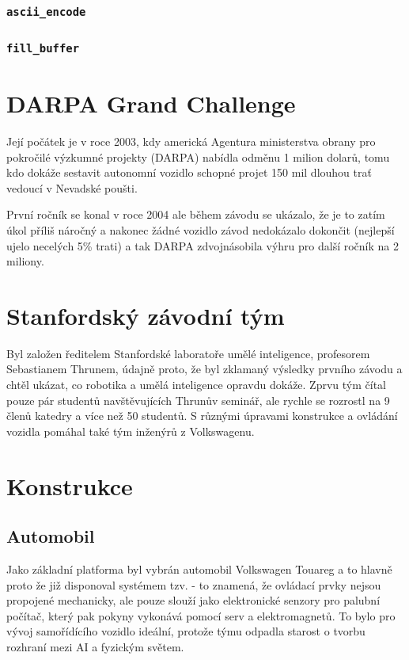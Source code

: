 \documentclass[12pt]{article}
\newcommand{\code}[1]{\colorbox{light-gray}{\mbox{\texttt{#1}}}}
\begin{document}
\subsubsection{\code{ascii\_encode}}

\subsubsection{\code{fill\_buffer}}


\section{DARPA Grand Challenge}
Její počátek je v roce 2003, kdy americká Agentura ministerstva obrany pro pokročilé výzkumné projekty
(DARPA) nabídla odměnu 1 milion dolarů, tomu kdo dokáže sestavit autonomní vozidlo schopné projet
150 mil dlouhou trať vedoucí v Nevadské poušti.

První ročník se konal v roce 2004 ale během závodu se ukázalo, že je to zatím úkol příliš náročný
a nakonec žádné vozidlo závod nedokázalo dokončit (nejlepší ujelo necelých 5\% trati) a tak DARPA
zdvojnásobila výhru pro další ročník na 2 miliony.

\section{Stanfordský závodní tým}
Byl založen ředitelem Stanfordské laboratoře umělé inteligence, profesorem Sebastianem Thrunem,
údajně proto, že byl zklamaný výsledky prvního závodu a chtěl ukázat, co robotika a umělá inteligence
opravdu dokáže. Zprvu tým čítal pouze pár studentů navštěvujících Thrunův seminář, ale rychle
se rozrostl na 9 členů katedry a více než 50 studentů. S různými úpravami konstrukce a ovládání
vozidla pomáhal také tým inženýrů z Volkswagenu.

\section{Konstrukce}

\subsection{Automobil}
Jako základní platforma byl vybrán automobil Volkswagen Touareg a to hlavně proto že již disponoval systémem
tzv.  - to znamená, že ovládací prvky nejsou propojené mechanicky, ale pouze slouží jako
elektronické senzory pro palubní počítač, který pak pokyny vykonává  pomocí serv a elektromagnetů.
To bylo pro vývoj samořídícího vozidlo ideální, protože týmu odpadla starost o tvorbu rozhraní mezi AI
a fyzickým světem.
\end{document}
